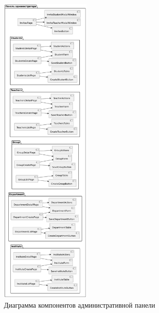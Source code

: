   
\begin{figure}[h]
	\centering
	\includegraphics[width=0.4\textwidth]{static/diagrams/AdminComponentDiagram.png}
	\caption{Диаграмма компонентов административной панели}
	\label{fig:admin-components}
\end{figure}

